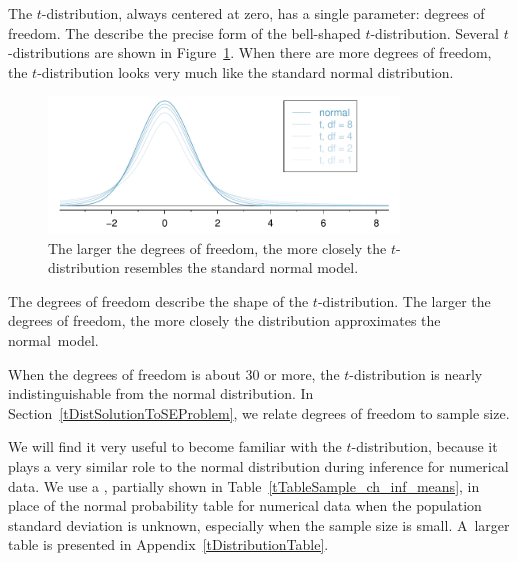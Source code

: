 The $t$-distribution, always centered at zero, has a single parameter: degrees of freedom. The  describe the precise form of the bell-shaped $t$-distribution. Several $t$-distributions are shown in Figure~\ref{tDistConvergeToNormalDist}. When there are more degrees of freedom, the $t$-distribution looks very much like the standard normal distribution.

\begin{figure}[h]
\centering
\includegraphics[width=0.83\textwidth]{ch_inference_for_means/figures/tDistConvergeToNormalDist/tDistConvergeToNormalDist}
\caption{The larger the degrees of freedom, the more closely the $t$-distribution resembles the standard normal model.\textA{\vspace{-3mm}}}
\label{tDistConvergeToNormalDist}
\end{figure}

\begin{termBox}{
The degrees of freedom describe the shape of the $t$-distribution. The larger the degrees of freedom, the more closely the distribution approximates the normal~model.}
\end{termBox}

When the degrees of freedom is about 30 or more, the $t$-distribution is nearly indistinguishable from the normal distribution. In Section~\ref{tDistSolutionToSEProblem}, we relate degrees of freedom to sample size.

We will find it very useful to become familiar with the $t$-distribution, because it plays a very similar role to the normal distribution during inference for numerical data. We use a , partially shown in Table~\ref{tTableSample_ch_inf_means}, in place of the normal probability table for numerical data when the population standard deviation is unknown, especially when the sample size is small. A~larger table is presented in Appendix~\ref{tDistributionTable}.

